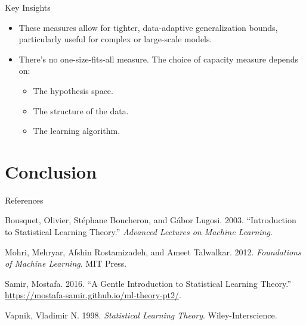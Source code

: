 \documentclass[
  ignorenonframetext,
]{beamer}
\providecommand{\tightlist}{%
  \setlength{\itemsep}{0pt}\setlength{\parskip}{0pt}}\usepackage{longtable,booktabs,array}
\newlength{\cslhangindent}
\newenvironment{CSLReferences}[2] %
 {\begin{list}{}{%
  \setlength{\itemindent}{0pt}
  \setlength{\leftmargin}{0pt}
  \setlength{\parsep}{0pt}
  \ifodd #1
   \setlength{\leftmargin}{\cslhangindent}
   \setlength{\itemindent}{-1\cslhangindent}
  \fi
  \setlength{\itemsep}{#2\baselineskip}}}
 {\end{list}}
\begin{document}
\begin{frame}
\begin{block}{Key Insights}
\label{key-insights-4}
\begin{itemize}
\tightlist
\item
  These measures allow for tighter, data-adaptive generalization bounds,
  particularly useful for complex or large-scale models.
\item
  There's no one-size-fits-all measure. The choice of capacity measure
  depends on:

  \begin{itemize}
  \tightlist
  \item
    The hypothesis space.
  \item
    The structure of the data.
  \item
    The learning algorithm.
  \end{itemize}
\end{itemize}
\end{block}
\end{frame}

\section{Conclusion}\label{conclusion}

\begin{frame}
\begin{block}{References}
\label{references}
\label{refs}
\begin{CSLReferences}{1}{0}
Bousquet, Olivier, Stéphane Boucheron, and Gábor Lugosi. 2003.
{``Introduction to Statistical Learning Theory.''} \emph{Advanced
Lectures on Machine Learning}.

Mohri, Mehryar, Afshin Rostamizadeh, and Ameet Talwalkar. 2012.
\emph{Foundations of Machine Learning}. MIT Press.

Samir, Mostafa. 2016. {``A Gentle Introduction to Statistical Learning
Theory.''} \url{https://mostafa-samir.github.io/ml-theory-pt2/}.

Vapnik, Vladimir N. 1998. \emph{Statistical Learning Theory}.
Wiley-Interscience.

\end{CSLReferences}
\end{block}
\end{frame}
\end{document}
